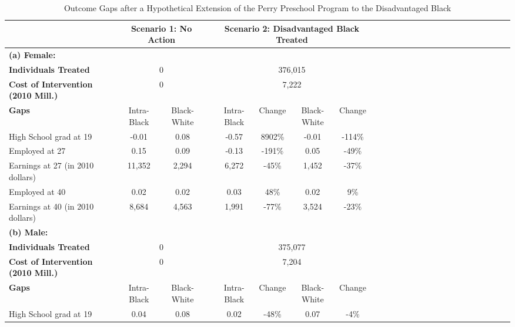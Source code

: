 \begin{table}[htbp]
\caption{\label{tab:tabp_perry} Outcome Gaps after a Hypothetical Extension of the Perry Preschool Program to the Disadvantaged Black}\medskip
\footnotesize  \begin{center} \begin{tabular}{lcccccccccccccccccccccccc}  \hline \hline    
&\multicolumn{2}{c}{Scenario 1: No Action} &\multicolumn{6}{c}{Scenario 2: Disadvantaged Black Treated}  \\[0.05cm] \hline
 \textbf{(a) Female:} & \multicolumn{2}{c}{}   &  &\multicolumn{4}{c}{}   \\[0.02cm] 
\textbf{Individuals Treated} &\multicolumn{2}{c}{ 0 } &
 &\multicolumn{4}{c}{     376,015} &
 \\[0.2cm]  
\textbf{Cost of Intervention (2010 Mill.)} &\multicolumn{2}{c}{ 0 } &
 &\multicolumn{4}{c}{       7,222} &
 \\[0.2cm]  
\textbf{Gaps}&Intra-Black &Black-White & &Intra-Black &Change &Black-White &Change  \\[0.02cm] 
\hline
High School grad at 19 &       -0.01&        0.08&&       -0.57&        8902\% &       -0.01&        -114\% &
 \\[0.2cm]  
Employed at 27 &        0.15&        0.09&&       -0.13&        -191\% &        0.05&         -49\% &
 \\[0.2cm]  
Earnings at 27 (in 2010 dollars) &      11,352&       2,294&&       6,272&         -45\% &       1,452&         -37\% &
 \\[0.2cm]  
Employed at 40 &        0.02&        0.02&&        0.03&          48\% &        0.02&           9\% &
 \\[0.2cm]  
Earnings at 40 (in 2010 dollars) &       8,684&       4,563&&       1,991&         -77\% &       3,524&         -23\% &
 \\[0.2cm]  
\hline
 \textbf{(b) Male:} & \multicolumn{2}{c}{}   &  &\multicolumn{4}{c}{}   \\[0.02cm] 
\textbf{Individuals Treated} &\multicolumn{2}{c}{ 0 } &
 &\multicolumn{4}{c}{     375,077} &
 \\[0.2cm]  
\textbf{Cost of Intervention (2010 Mill.)} &\multicolumn{2}{c}{ 0 } &
 &\multicolumn{4}{c}{       7,204} &
 \\[0.2cm]  
\textbf{Gaps}&Intra-Black &Black-White & &Intra-Black &Change &Black-White &Change  \\[0.02cm] 
\hline
High School grad at 19 &        0.04&        0.08&&        0.02&         -48\% &        0.07&          -4\% &

\end{tabular}
\end{center}
\end{table}
